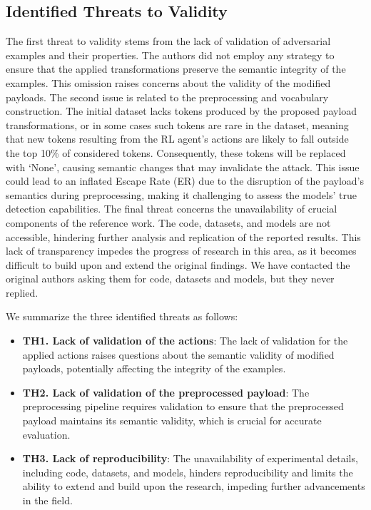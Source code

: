 \subsection{Identified Threats to Validity}


The first threat to validity stems from the lack of validation of adversarial examples and their properties. The authors did not employ any strategy to ensure that the applied transformations preserve the semantic integrity of the examples. This omission raises concerns about the validity of the modified payloads. The second issue is related to the preprocessing and vocabulary construction. The initial dataset lacks tokens produced by the proposed payload transformations, or in some cases such tokens are rare in the dataset, meaning that new tokens resulting from the RL agent's actions are likely to fall outside the top 10\% of considered tokens. Consequently, these tokens will be replaced with `None', causing semantic changes that may invalidate the attack. This issue could lead to an inflated Escape Rate (ER) due to the disruption of the payload's semantics during preprocessing, making it challenging to assess the models' true detection capabilities. The final threat concerns the unavailability of crucial components of the reference work. The code, datasets, and models are not accessible, hindering further analysis and replication of the reported results. This lack of transparency impedes the progress of research in this area, as it becomes difficult to build upon and extend the original findings. We have contacted the original authors asking them for code, datasets and models, but they never replied.

We summarize the three identified threats as follows:
\begin{itemize}
    \item \textbf{TH1. Lack of validation of the actions}: The lack of validation for the applied actions raises questions about the semantic validity of modified payloads, potentially affecting the integrity of the examples.
    
    \item \textbf{TH2. Lack of validation of the preprocessed payload}: The preprocessing pipeline requires validation to ensure that the preprocessed payload maintains its semantic validity, which is crucial for accurate evaluation.
    
    \item \textbf{TH3. Lack of reproducibility}: The unavailability of experimental details, including code, datasets, and models, hinders reproducibility and limits the ability to extend and build upon the research, impeding further advancements in the field.
\end{itemize}

